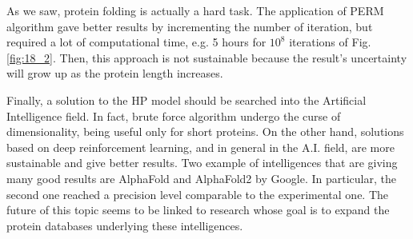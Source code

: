 As we saw, protein folding is actually a hard task.
The application of PERM algorithm gave better results by incrementing the number of iteration, but required a lot of computational time, e.g. 5 hours for $10^8$ iterations of Fig. \ref{fig:18_2}.
Then, this approach is not sustainable because the result's uncertainty will grow up as the protein length increases.


Finally, a solution to the HP model should be searched into the Artificial Intelligence field.
In fact, brute force algorithm undergo the curse of dimensionality, being useful only for short proteins.
On the other hand, solutions based on deep reinforcement learning, and in general in the A.I. field, are more sustainable and give better results.
Two example of intelligences that are giving many good results are AlphaFold and AlphaFold2 by Google.
In particular, the second one reached a precision level comparable to the experimental one.
The future of this topic seems to be linked to research whose goal is to expand the protein databases underlying these intelligences.